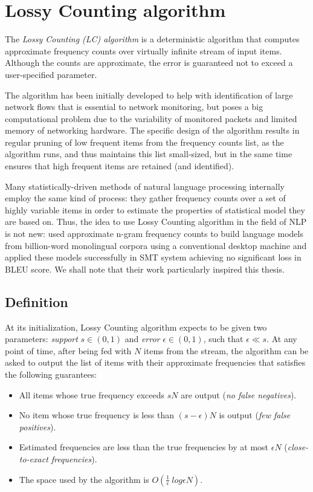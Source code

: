 \chapter{Lossy Counting algorithm}
\label{chap:lossy-counting}

The \emph{Lossy Counting (LC) algorithm} \citep{manku:lossycounting} is
a deterministic algorithm that computes approximate frequency counts
over virtually infinite stream of input items.
Although the counts are approximate, the error is guaranteed not to exceed
a user-specified parameter.

The algorithm has been initially developed to help with identification of
large network flows that is essential to network monitoring, but poses a big
computational problem due to the variability of monitored packets and limited
memory of networking hardware.
The specific design of the algorithm results in regular pruning of low frequent
items from the frequency counts list, as the algorithm runs, and thus maintains
this list small-sized, but in the same time ensures that high frequent items are
retained (and identified).

Many statistically-driven methods of natural language processing internally
employ the same kind of process: they gather frequency counts over a set of highly
variable items in order to estimate the properties of statistical model they are
based on.
Thus, the idea to use Lossy Counting algorithm in the field of NLP is not new:
\citet{goyal:streaminglm} used approximate n-gram frequency counts to build language
models from billion-word monolingual corpora using a conventional desktop machine and
applied these models successfully in SMT system achieving no significant loss in BLEU
score. We shall note that their work particularly inspired this thesis.

\section{Definition}

At its initialization, Lossy Counting algorithm expects to be given two parameters:
\emph{support} $s \in (0,1)$ and \emph{error} $\epsilon \in (0,1)$, such
that $\epsilon \ll s$.
At any point of time, after being fed with $N$ items from the stream,
the algorithm can be asked to output the list of items with their approximate
frequencies that satisfies the following guarantees:
\begin{itemize}
 \item All items whose true frequency exceeds $sN$ are output
  (\emph{no false negatives}).
 \item No item whose true frequency is less than $(s - \epsilon)N$ is output
  (\emph{few false positives}).
 \item Estimated frequencies are less than the true frequencies by at most
  $\epsilon N$ (\emph{close-to-exact frequencies}).
 \item The space used by the algorithm is $O(\frac{1}{\epsilon}~log \epsilon N)$.
\end{itemize}

